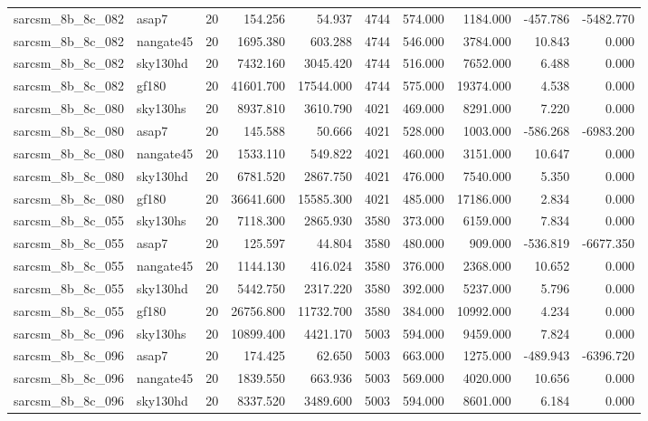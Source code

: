 \begin{longtable}{llrrrrrrrr}
sarcsm\_8b\_8c\_082 & asap7 & 20 & 154.256 & 54.937 & 4744 & 574.000 & 1184.000 & -457.786 & -5482.770 \\
sarcsm\_8b\_8c\_082 & nangate45 & 20 & 1695.380 & 603.288 & 4744 & 546.000 & 3784.000 & 10.843 & 0.000 \\
sarcsm\_8b\_8c\_082 & sky130hd & 20 & 7432.160 & 3045.420 & 4744 & 516.000 & 7652.000 & 6.488 & 0.000 \\
sarcsm\_8b\_8c\_082 & gf180 & 20 & 41601.700 & 17544.000 & 4744 & 575.000 & 19374.000 & 4.538 & 0.000 \\
sarcsm\_8b\_8c\_080 & sky130hs & 20 & 8937.810 & 3610.790 & 4021 & 469.000 & 8291.000 & 7.220 & 0.000 \\
sarcsm\_8b\_8c\_080 & asap7 & 20 & 145.588 & 50.666 & 4021 & 528.000 & 1003.000 & -586.268 & -6983.200 \\
sarcsm\_8b\_8c\_080 & nangate45 & 20 & 1533.110 & 549.822 & 4021 & 460.000 & 3151.000 & 10.647 & 0.000 \\
sarcsm\_8b\_8c\_080 & sky130hd & 20 & 6781.520 & 2867.750 & 4021 & 476.000 & 7540.000 & 5.350 & 0.000 \\
sarcsm\_8b\_8c\_080 & gf180 & 20 & 36641.600 & 15585.300 & 4021 & 485.000 & 17186.000 & 2.834 & 0.000 \\
sarcsm\_8b\_8c\_055 & sky130hs & 20 & 7118.300 & 2865.930 & 3580 & 373.000 & 6159.000 & 7.834 & 0.000 \\
sarcsm\_8b\_8c\_055 & asap7 & 20 & 125.597 & 44.804 & 3580 & 480.000 & 909.000 & -536.819 & -6677.350 \\
sarcsm\_8b\_8c\_055 & nangate45 & 20 & 1144.130 & 416.024 & 3580 & 376.000 & 2368.000 & 10.652 & 0.000 \\
sarcsm\_8b\_8c\_055 & sky130hd & 20 & 5442.750 & 2317.220 & 3580 & 392.000 & 5237.000 & 5.796 & 0.000 \\
sarcsm\_8b\_8c\_055 & gf180 & 20 & 26756.800 & 11732.700 & 3580 & 384.000 & 10992.000 & 4.234 & 0.000 \\
sarcsm\_8b\_8c\_096 & sky130hs & 20 & 10899.400 & 4421.170 & 5003 & 594.000 & 9459.000 & 7.824 & 0.000 \\
sarcsm\_8b\_8c\_096 & asap7 & 20 & 174.425 & 62.650 & 5003 & 663.000 & 1275.000 & -489.943 & -6396.720 \\
sarcsm\_8b\_8c\_096 & nangate45 & 20 & 1839.550 & 663.936 & 5003 & 569.000 & 4020.000 & 10.656 & 0.000 \\
sarcsm\_8b\_8c\_096 & sky130hd & 20 & 8337.520 & 3489.600 & 5003 & 594.000 & 8601.000 & 6.184 & 0.000 \\

\end{longtable}
